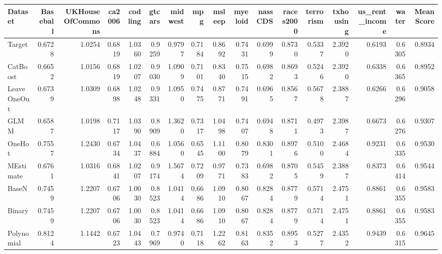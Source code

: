 \begin{tabular}{lrrrrrrrrrrrrrrrr}
\toprule
Dataset &  Baseball &  UKHouseOfCommons &  ca2006 &  codling &  gtcars &  midwest &     mpg &  msleep &  myeloid &  nassCDS &  races2000 &  terrorism &  txhousing &  us\_rent\_income &   water &  MeanScore \\
\midrule
Target             &    0.6728 &            1.0254 &  0.6819 &   1.0360 &  0.9259 &   0.9797 &  0.7184 &  0.8692 &   0.7431 &   0.6999 &     0.8730 &     0.5337 &     2.3920 &          0.6193 &  0.6305 &     0.8934 \\
CatBoost           &    0.6652 &            1.0156 &  0.6819 &   1.0207 &  0.9030 &   1.0909 &  0.7101 &  0.8340 &   0.7515 &   0.6982 &     0.8693 &     0.5246 &     2.3920 &          0.6338 &  0.6365 &     0.8952 \\
LeaveOneOut        &    0.6739 &            1.0309 &  0.6898 &   1.0248 &  0.9331 &   1.0950 &  0.7475 &  0.8771 &   0.7491 &   0.6965 &     0.8567 &     0.5678 &     2.3887 &          0.6266 &  0.6296 &     0.9058 \\
GLMM               &    0.6587 &            1.0198 &  0.7117 &   1.0390 &  0.8909 &   1.3620 &  0.7317 &  1.0498 &   0.7407 &   0.6948 &     0.8711 &     0.4973 &     2.3987 &          0.6673 &  0.6276 &     0.9307 \\
OneHot             &    0.7557 &            1.2430 &  0.6734 &   1.0437 &  0.6884 &   1.0560 &  0.6545 &  1.1100 &   0.8079 &   0.8301 &     0.8976 &     0.5100 &     2.4684 &          0.9231 &  0.6335 &     0.9530 \\
MEstimate          &    0.6761 &            1.0316 &  0.6841 &   1.0207 &  0.9174 &   1.5674 &  0.7209 &  0.9771 &   0.7383 &   0.6982 &     0.8705 &     0.5459 &     2.3887 &          0.8373 &  0.6414 &     0.9544 \\
BaseN              &    0.7459 &            1.2207 &  0.6706 &   1.0030 &  0.8523 &   1.0414 &  0.6686 &  1.0910 &   0.8067 &   0.8284 &     0.8779 &     0.5714 &     2.4751 &          0.8861 &  0.6355 &     0.9583 \\
Binary             &    0.7459 &            1.2207 &  0.6706 &   1.0030 &  0.8523 &   1.0414 &  0.6686 &  1.0910 &   0.8067 &   0.8284 &     0.8779 &     0.5714 &     2.4751 &          0.8861 &  0.6355 &     0.9583 \\
Polynomial         &    0.8124 &            1.1442 &  0.6723 &   1.0443 &  0.7969 &   0.9740 &  0.7118 &  1.2262 &   0.8163 &   0.8352 &     0.8953 &     0.5277 &     2.4352 &          0.9439 &  0.6315 &     0.9645 \\

\end{tabular}

